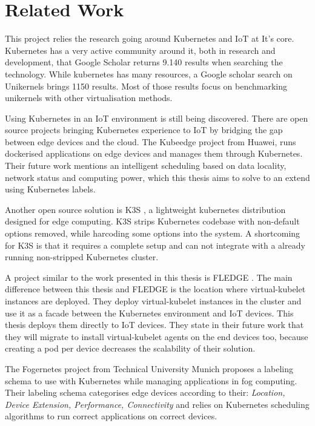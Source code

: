 
\chapter{Related Work}\label{chapter:literature}

This project relies the research going around Kubernetes and IoT at It's core. Kubernetes has a very active community around it, both in research and development, that Google Scholar returns 9.140 results when searching the technology. While kubernetes has many resources, a Google scholar search on Unikernels brings 1150 results. Most of those results focus on benchmarking unikernels with other virtualisation methods.

Using Kubernetes in an IoT environment is still being discovered. There are open source projects bringing Kubernetes experience to IoT by bridging the gap between edge devices and the cloud. The Kubeedge project \cite{kubeedge} from Huawei, runs dockerised applications on edge devices and manages them through Kubernetes. Their future work mentions an intelligent scheduling based on data locality, network status and computing power, which this thesis aims to solve to an extend using Kubernetes labels.

Another open source solution is K3S \cite{k3s}, a lightweight kubernetes distribution designed for edge computing. K3S strips Kubernetes codebase with non-default options removed, while harcoding some options into the system. A shortcoming for K3S is that it requires a complete setup and can not integrate with a already running non-stripped Kubernetes cluster.

A project similar to the work presented in this thesis is FLEDGE \cite{fledge}. The main difference between this thesis and FLEDGE is the location where virtual-kubelet instances are deployed. They deploy virtual-kubelet instances in the cluster and use it as a facade between the Kubernetes environment and IoT devices. This thesis deploys them directly to IoT devices. They state in their future work that they will migrate to install virtual-kubelet agents on the end devices too, because creating a pod per device decreases the scalability of their solution.

The Fogernetes project \cite{fogernetes} from Technical University Munich proposes a labeling schema to use with Kubernetes while managing applications in fog computing. Their labeling schema categorises edge devices according to their: \textit{Location, Device Extension, Performance, Connectivity} and relies on Kubernetes scheduling algorithms to run correct applications on correct devices.

